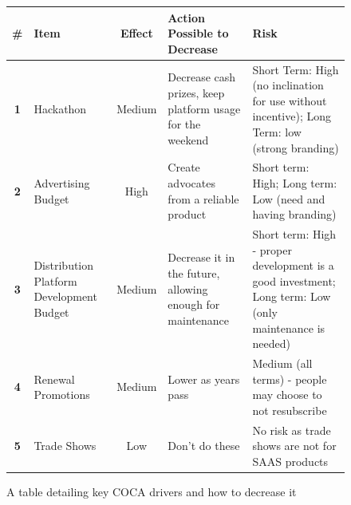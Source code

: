 \documentclass{article}
\begin{document}
    \begin{figure}[h!]
        \begin{center}
            \begin{tabular}{| c | p{2cm} | c | p{3.5cm} | p{5cm} |}
                \hline
                \raggedright \textbf{\#} &
                    \raggedright \textbf{Item} &
                    \raggedright \textbf{Effect} &
                    \raggedright \textbf{Action Possible to Decrease} & 
                    \textbf{Risk}
                \\ \hline
                \textbf{1} & \raggedright Hackathon &  Medium & \raggedright Decrease cash prizes, keep platform usage for the weekend & Short Term: High (no inclination for use without incentive); Long Term: low (strong branding)
                \\ \hline
                \textbf{2} & \raggedright Advertising Budget & High & \raggedright Create advocates from a reliable product & Short term: High; Long term: Low (need and having branding)
                \\ \hline
                \textbf{3} & \raggedright Distribution Platform Development Budget & Medium & \raggedright Decrease it in the future, allowing enough for maintenance & Short term: High - proper development is a good investment; Long term: Low (only maintenance is needed)
                \\ \hline
                \textbf{4} & \raggedright Renewal Promotions & Medium & \raggedright Lower as years pass & Medium (all terms) - people may choose to not resubscribe
                \\ \hline
                \textbf{5} & Trade Shows & Low & Don't do these & No risk as trade shows are not for SAAS products
                \\ \hline
            \end{tabular}
            \caption{A table detailing key COCA drivers and how to decrease it}
        \end{center}
    \end{figure}
\end{document}
